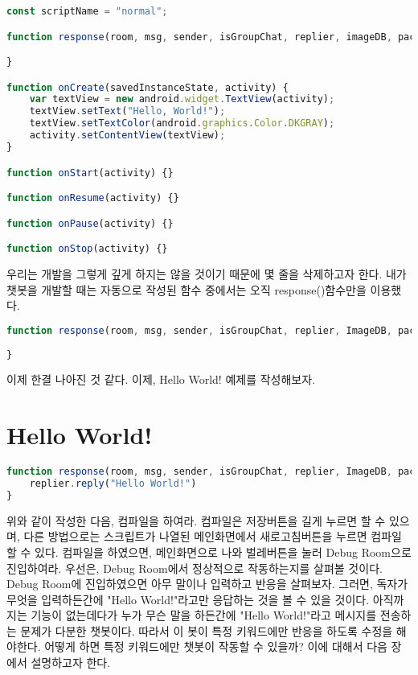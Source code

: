 \documentclass[10pt,b6paper,final]{book}
\begin{document}
\begin{lstlisting}[language=JavaScript,escapeinside=~~,caption={normal.js}]
const scriptName = "normal";

function response(room, msg, sender, isGroupChat, replier, imageDB, packageName) {

}

function onCreate(savedInstanceState, activity) {
    var textView = new android.widget.TextView(activity);
    textView.setText("Hello, World!");
    textView.setTextColor(android.graphics.Color.DKGRAY);
    activity.setContentView(textView);
}

function onStart(activity) {}

function onResume(activity) {}

function onPause(activity) {}

function onStop(activity) {}
\end{lstlisting}

우리는 개발을 그렇게 깊게 하지는 않을 것이기 때문에 몇 줄을 삭제하고자 한다.
내가 챗봇을 개발할 때는 자동으로 작성된 함수 중에서는 오직 response()함수만을 이용했다.

\begin{lstlisting}[language=JavaScript,escapeinside=~~]
function response(room, msg, sender, isGroupChat, replier, ImageDB, packageName, threadId){
    
}
\end{lstlisting}

이제 한결 나아진 것 같다. 이제, Hello World! 예제를 작성해보자.

\section{Hello World!}
\begin{lstlisting}[language=JavaScript,escapeinside=~~]
function response(room, msg, sender, isGroupChat, replier, ImageDB, packageName, threadId){
    replier.reply("Hello World!")
}
\end{lstlisting}
위와 같이 작성한 다음, 컴파일을 하여라.
컴파일은 저장버튼을 길게 누르면 할 수 있으며, 다른 방법으로는
스크립트가 나열된 메인화면에서 새로고침버튼을 누르면 컴파일할 수 있다.
컴파일을 하였으면, 메인화면으로 나와 벌레버튼을 눌러 Debug Room으로 진입하여라.
우선은, Debug Room에서 정상적으로 작동하는지를 살펴볼 것이다.
Debug Room에 진입하였으면 아무 말이나 입력하고 반응을 살펴보자.
그러면, 독자가 무엇을 입력하든간에 "Hello World!"라고만 응답하는 것을 볼 수 있을 것이다.
아직까지는 기능이 없는데다가 누가 무슨 말을 하든간에 "Hello World!"라고 메시지를 전송하는
문제가 다분한 챗봇이다. 따라서 이 봇이 특정 키워드에만 반응을 하도록 수정을 해야한다. 
어떻게 하면 특정 키워드에만 챗봇이 작동할 수 있을까?
이에 대해서 다음 장에서 설명하고자 한다.
\end{document}
